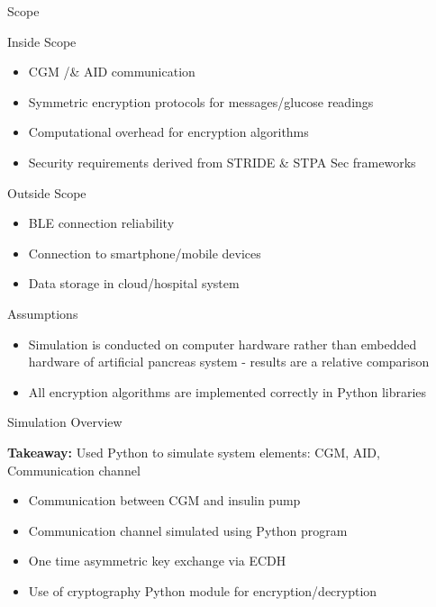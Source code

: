 \documentclass[aspectratio=169]{beamer}
\begin{document}
\begin{frame}{Scope}
    
    \begin{block}{Inside Scope}
        
        \begin{itemize}
            \item CGM /& AID communication
            \item  Symmetric encryption protocols for messages/glucose readings
            \item Computational overhead for encryption algorithms
            \item Security requirements derived from STRIDE \& STPA Sec frameworks
        \end{itemize}
    \end{block}

    \begin{block}{Outside Scope}
        \begin{itemize}
            \item BLE connection reliability
            \item Connection to smartphone/mobile devices
            \item Data storage in cloud/hospital system
        \end{itemize}
    \end{block}
\end{frame}

\begin{frame}{Assumptions}
        \begin{itemize}
            \item Simulation is conducted on computer hardware rather than embedded hardware of artificial pancreas system - results are a relative comparison
            \item All encryption algorithms are implemented correctly in Python libraries
        \end{itemize}

\end{frame}

\begin{frame}{Simulation Overview}
    \begin{alertblock}{}
        \centering
        \footnotesize\textbf{Takeaway: } Used Python to simulate system elements: CGM, AID, Communication channel 
    \end{alertblock}
    \vspace{1.4cm}
    
    \begin{itemize}
        \item Communication between CGM and insulin pump
        \item Communication channel simulated using Python program
        \item One time asymmetric key exchange via ECDH
        \item Use of cryptography Python module for encryption/decryption 
    \end{itemize}
\end{frame}
\end{document}
